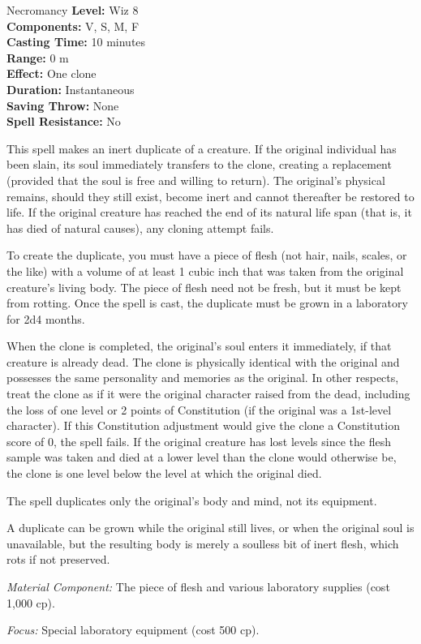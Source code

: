 {Necromancy}
{
	\textbf{Level:}
	Wiz 8\\
	\textbf{Components:}
	V, S, M, F\\
	\textbf{Casting Time:}
	10 minutes\\
	\textbf{Range:}
	0 m\\
	\textbf{Effect:}
	One clone\\
	\textbf{Duration:}
	Instantaneous\\
	\textbf{Saving Throw:}
	None\\
	\textbf{Spell Resistance:}
	No\\
}
{
	This spell makes an inert duplicate of a creature. If the original individual has been slain, its soul immediately transfers to the clone, creating a replacement (provided that the soul is free and willing to return). The original's physical remains, should they still exist, become inert and cannot thereafter be restored to life. If the original creature has reached the end of its natural life span (that is, it has died of natural causes), any cloning attempt fails.

	To create the duplicate, you must have a piece of flesh (not hair, nails, scales, or the like) with a volume of at least 1 cubic inch that was taken from the original creature's living body. The piece of flesh need not be fresh, but it must be kept from rotting. Once the spell is cast, the duplicate must be grown in a laboratory for 2d4 months.

	When the clone is completed, the original's soul enters it immediately, if that creature is already dead. The clone is physically identical with the original and possesses the same personality and memories as the original. In other respects, treat the clone as if it were the original character raised from the dead, including the loss of one level or 2 points of Constitution (if the original was a 1st-level character). If this Constitution adjustment would give the clone a Constitution score of 0, the spell fails. If the original creature has lost levels since the flesh sample was taken and died at a lower level than the clone would otherwise be, the clone is one level below the level at which the original died.

	The spell duplicates only the original's body and mind, not its equipment.

	A duplicate can be grown while the original still lives, or when the original soul is unavailable, but the resulting body is merely a soulless bit of inert flesh, which rots if not preserved.

	\textit{Material Component:}
	The piece of flesh and various laboratory supplies (cost 1,000 cp).

	\textit{Focus:}
	Special laboratory equipment (cost 500 cp).

}
